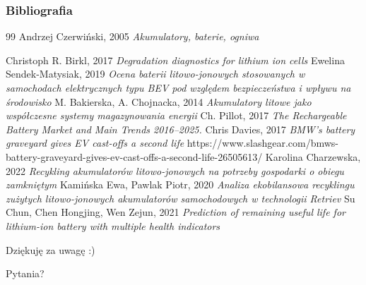 \documentclass[
	11pt, %
]{beamer}
\begin{document}
\begin{frame} %
	\frametitle{Bibliografia}
	
	\begin{thebibliography}{99} %
	\tiny	
			Andrzej Czerwiński, 2005
			\newblock \emph{Akumulatory, baterie, ogniwa}
			
			Christoph R. Birkl, 2017
			\newblock \emph{Degradation diagnostics for lithium ion cells}
			Ewelina Sendek-Matysiak, 2019
			\newblock \emph{ Ocena baterii litowo-jonowych stosowanych w samochodach elektrycznych typu BEV pod względem bezpieczeństwa i wpływu na środowisko }
			M. Bakierska, A. Chojnacka, 2014
			\newblock \emph{Akumulatory litowe jako współczesne systemy magazynowania energii}
			Ch. Pillot, 2017
			\newblock \emph{The Rechargeable Battery Market and Main Trends 2016–2025.}
			Chris Davies, 2017
			\newblock \emph{BMW's battery graveyard gives EV cast-offs a second life}
			https://www.slashgear.com/bmws-battery-graveyard-gives-ev-cast-offs-a-second-life-26505613/
			Karolina Charzewska, 2022
			\newblock \emph{ Recykling akumulatorów litowo-jonowych na potrzeby gospodarki o obiegu zamkniętym }
			Kamińska Ewa, Pawlak Piotr, 2020
			\newblock \emph{ Analiza ekobilansowa recyklingu zużytych litowo-jonowych akumulatorów samochodowych w technologii Retriev }
			Su Chun, Chen Hongjing, Wen Zejun, 2021
			\newblock \emph{Prediction of remaining useful life for lithium-ion battery with multiple health indicators}
	\end{thebibliography}
\end{frame}


\begin{frame}[plain] %
	\begin{center}
		{\Huge Dziękuję za uwagę :)}
		
		\bigskip\bigskip %
		
		{\LARGE Pytania?}
	\end{center}
\end{frame}

\end{document}
